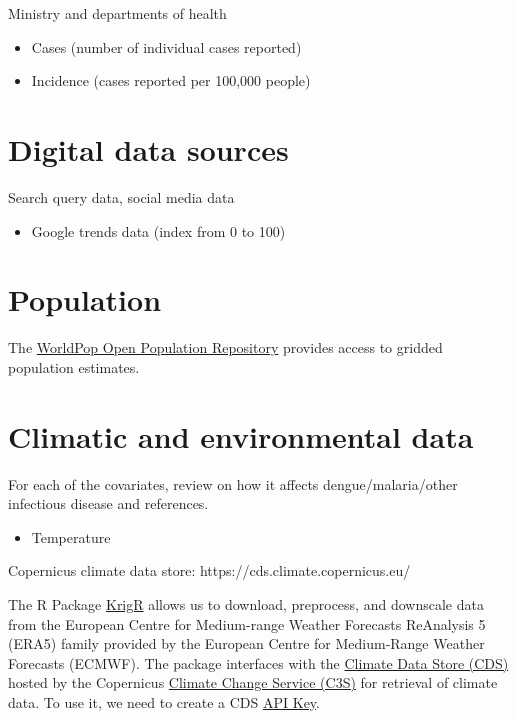 \documentclass[
  letterpaper,
  DIV=11,
  numbers=noendperiod]{scrreprt}
\providecommand{\tightlist}{%
  \setlength{\itemsep}{0pt}\setlength{\parskip}{0pt}}\usepackage{longtable,booktabs,array}
\begin{document}
Ministry and departments of health

\begin{itemize}
\tightlist
\item
  Cases (number of individual cases reported)
\item
  Incidence (cases reported per 100,000 people)
\end{itemize}

\hypertarget{digital-data-sources}{%
\section{Digital data sources}\label{digital-data-sources}}

Search query data, social media data

\begin{itemize}
\tightlist
\item
  Google trends data (index from 0 to 100)
\end{itemize}

\hypertarget{population}{%
\section{Population}\label{population}}

The \href{https://wopr.worldpop.org/}{WorldPop Open Population
Repository} provides access to gridded population estimates.

\hypertarget{climatic-and-environmental-data}{%
\section{Climatic and environmental
data}\label{climatic-and-environmental-data}}

For each of the covariates, review on how it affects
dengue/malaria/other infectious disease and references.

\begin{itemize}
\tightlist
\item
  Temperature
\end{itemize}

Copernicus climate data store: https://cds.climate.copernicus.eu/

The R Package \href{https://github.com/ErikKusch/KrigR}{KrigR} allows us
to download, preprocess, and downscale data from the European Centre for
Medium-range Weather Forecasts ReAnalysis 5 (ERA5) family provided by
the European Centre for Medium‐Range Weather Forecasts (ECMWF). The
package interfaces with the
\href{https://cds.climate.copernicus.eu/\#!/home}{Climate Data Store
(CDS)} hosted by the Copernicus
\href{https://cds.climate.copernicus.eu/about-c3s}{Climate Change
Service (C3S)} for retrieval of climate data. To use it, we need to
create a CDS \href{https://cds.climate.copernicus.eu/api-how-to}{API
Key}.
\end{document}
